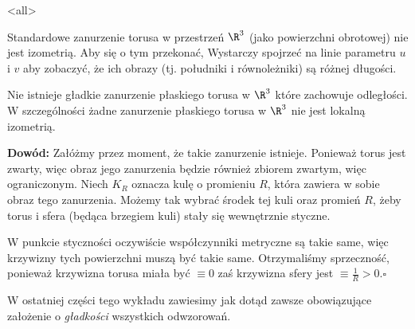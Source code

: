 \mode<all>{}

\begin{frame}
Standardowe zanurzenie torusa w przestrzeń $\R^3$ (jako powierzchni obrotowej) nie jest izometrią. Aby się o tym przekonać, Wystarczy spojrzeć na linie parametru $u$ i $v$ aby zobaczyć, że ich obrazy (tj. południki i równoleżniki) są różnej długości. 

\begin{center}

\end{center}


\end{frame}

\begin{frame}
\begin{twierdzenie}
Nie istnieje gładkie zanurzenie płaskiego torusa w $\R^3$ które zachowuje odległości. W szczególności żadne zanurzenie płaskiego torusa w $\R^3$ nie jest lokalną izometrią.
\end{twierdzenie}

\pause \textcolor{ared}{\textbf{Dowód:}}\newline
Załóżmy przez moment, że takie zanurzenie istnieje. Ponieważ torus jest zwarty, więc obraz jego zanurzenia będzie również zbiorem zwartym, więc ograniczonym. Niech $K_{R}$ oznacza kulę o promieniu $R$, która zawiera w sobie obraz tego zanurzenia. Możemy tak wybrać środek tej kuli oraz promień $R$, żeby torus i sfera (będąca brzegiem kuli) stały się wewnętrznie styczne.
\end{frame}

\begin{frame}
\begin{center}

\end{center}

W punkcie styczności oczywiście współczynniki metryczne są takie same, więc krzywizny tych powierzchni muszą być takie same. Otrzymaliśmy sprzeczność, ponieważ krzywizna torusa miała być $\equiv 0$ zaś krzywizna sfery jest $\equiv \frac{1}{R}>0$.\hfill $\square$

\end{frame}

\begin{frame}
\begin{uwaga}
W ostatniej części tego wykładu zawiesimy jak dotąd zawsze obowiązujące założenie o \textit{gładkości} wszystkich odwzorowań.
\end{uwaga}
\end{frame}



